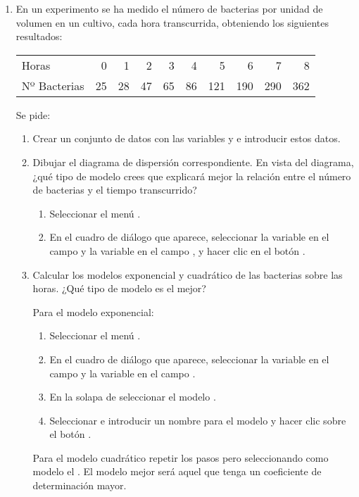 \begin{enumerate}[leftmargin=*]
\item En un experimento se ha medido el número de bacterias por unidad de volumen en un cultivo, cada hora transcurrida,
obteniendo los siguientes resultados:
\begin{center}
\begin{tabular}{lrrrrrrrrr}
\hline
Horas & 0 & 1 & 2 & 3 & 4 & 5 & 6 & 7 & 8  \\
Nº Bacterias & 25 & 28 & 47 & 65 & 86 & 121 & 190 & 290 & 362\\
\hline
\end{tabular}
\end{center}

Se pide:
\begin{enumerate}
\item Crear un conjunto de datos con las variables  y  e introducir estos datos.

\item Dibujar el diagrama de dispersión correspondiente. En vista del diagrama, ¿qué tipo de modelo crees que explicará
mejor la relación entre el número de bacterias y el tiempo transcurrido? 
\begin{indicacion}
\begin{enumerate}
\item Seleccionar el menú .
\item En el cuadro de diálogo que aparece, seleccionar la variable  en el campo 
y la variable  en el campo , y hacer clic en el botón .
\end{enumerate}
\end{indicacion}

\item Calcular los modelos exponencial y cuadrático de las bacterias sobre las horas. ¿Qué tipo de modelo es el mejor?
\begin{indicacion}
Para el modelo exponencial:
\begin{enumerate}
\item Seleccionar el menú .
\item En el cuadro de diálogo que aparece, seleccionar la variable  en el campo  y la variable  en el campo .
\item En la solapa de  seleccionar el modelo .
\item Seleccionar  e introducir un nombre para el modelo y hacer clic sobre el botón .
\end{enumerate}
Para el modelo cuadrático repetir los pasos pero seleccionando como modelo el . 
El modelo mejor será aquel que tenga un coeficiente de determinación mayor.
\end{indicacion}


\end{enumerate}
\end{enumerate}
